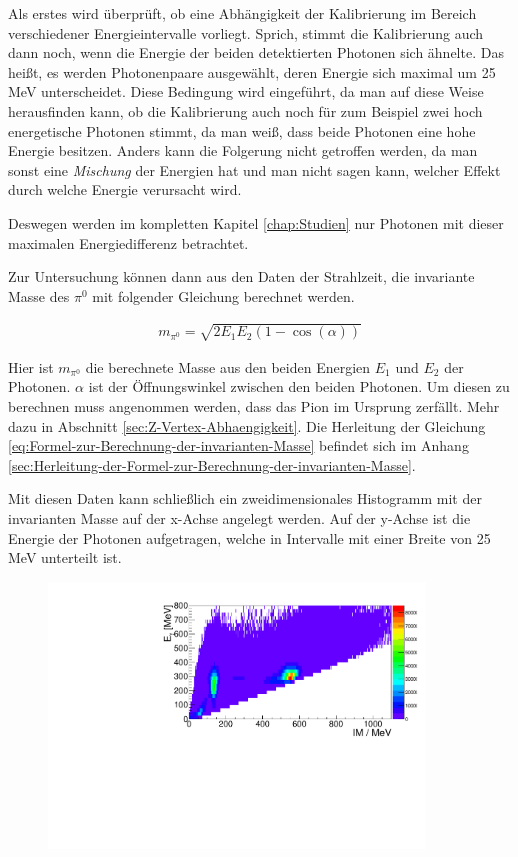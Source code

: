 \documentclass[a4paper,11pt,oneside,final,german,openbib,pdftex]{scrbook}
\begin{document}
{Als erstes wird überprüft, ob eine Abhängigkeit der Kalibrierung im Bereich verschiedener Energieintervalle vorliegt. Sprich, stimmt die Kalibrierung auch dann noch, wenn die Energie der beiden detektierten Photonen sich ähnelte. Das hei{\ss}t, es werden Photonenpaare ausgew\"ahlt, deren Energie sich maximal um 25 MeV unterscheidet. Diese Bedingung wird eingef\"uhrt, da man auf diese Weise herausfinden kann, ob die Kalibrierung auch noch f\"ur zum Beispiel zwei hoch energetische Photonen stimmt, da man wei{\ss}, dass beide Photonen eine hohe Energie besitzen. Anders kann die Folgerung nicht getroffen werden, da man sonst eine \textit{Mischung} der Energien hat und man nicht sagen kann, welcher Effekt durch welche Energie verursacht wird.

Deswegen werden im kompletten Kapitel \ref{chap:Studien} nur Photonen mit dieser maximalen Energiedifferenz betrachtet.

Zur Untersuchung k\"onnen dann aus den Daten der Strahlzeit, die invariante Masse des $\pi^0$ mit folgender Gleichung berechnet werden.

 \begin{equation}
 \begin{split}
 {m_{\pi^0}=\sqrt{2E_1E_2(1-\cos(\alpha))}}
 \label{eq:Formel-zur-Berechnung-der-invarianten-Masse}
 \end{split}
 \end{equation}

Hier ist $m_{\pi^0}$ die berechnete Masse aus den beiden Energien $E_1$ und $E_2$ der Photonen. $\alpha$ ist der \"Offnungswinkel zwischen den beiden Photonen. Um diesen zu berechnen muss angenommen werden, dass das Pion im Ursprung zerf\"allt. Mehr dazu in Abschnitt \ref{sec:Z-Vertex-Abhaengigkeit}.
Die Herleitung der Gleichung \ref{eq:Formel-zur-Berechnung-der-invarianten-Masse} befindet sich im Anhang \ref{sec:Herleitung-der-Formel-zur-Berechnung-der-invarianten-Masse}.

Mit diesen Daten kann schließlich ein zweidimensionales Histogramm mit der invarianten Masse auf der x-Achse angelegt werden. Auf der y-Achse ist die Energie der Photonen aufgetragen, welche in Intervalle mit einer Breite von 25 MeV unterteilt ist. 


\begin{figure}[h!]
	\begin{center}
		\includegraphics[width=100mm]{NewCalib/Strahlzeit2014/20171904Uncharged2DHist}
	

\end{center}
\end{figure}}
\end{document}
